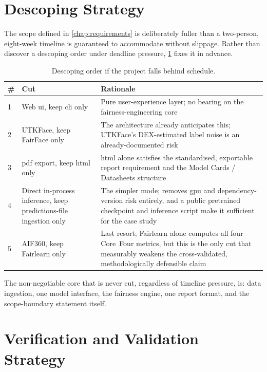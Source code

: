 \section{Descoping Strategy}
\label{sec:cutlist}

The scope defined in \cref{chap:requirements} is deliberately fuller than a two-person, eight-week timeline is guaranteed to accommodate without slippage. Rather than discover a descoping order under deadline pressure, \cref{tab:cutlist} fixes it in advance.

\begin{table}[htbp]
    \centering
    \caption{Descoping order if the project falls behind schedule.}
    \label{tab:cutlist}
    \begin{tabular}{p{0.6cm}p{3.6cm}p{7.3cm}}
        \toprule
        \textbf{\#} & \textbf{Cut} & \textbf{Rationale} \\
        \midrule
        1 & Web \gls{ui}, keep \gls{cli} only & Pure user-experience layer; no bearing on the fairness-engineering core \\
        2 & UTKFace, keep FairFace only & The architecture already anticipates this; UTKFace's DEX-estimated label noise is an already-documented risk \\
        3 & \gls{pdf} export, keep \gls{html} only & \gls{html} alone satisfies the standardised, exportable report requirement and the Model Cards / Datasheets structure \\
        4 & Direct in-process inference, keep predictions-file ingestion only & The simpler mode; removes \gls{gpu} and dependency-version risk entirely, and a public pretrained checkpoint and inference script make it sufficient for the case study \\
        5 & AIF360, keep Fairlearn only & Last resort; Fairlearn alone computes all four Core~Four metrics, but this is the only cut that measurably weakens the cross-validated, methodologically defensible claim \\
        \bottomrule
    \end{tabular}
\end{table}

The non-negotiable core that is never cut, regardless of timeline pressure, is: data ingestion, one model interface, the fairness engine, one report format, and the scope-boundary statement itself.

\section{Verification and Validation Strategy}

